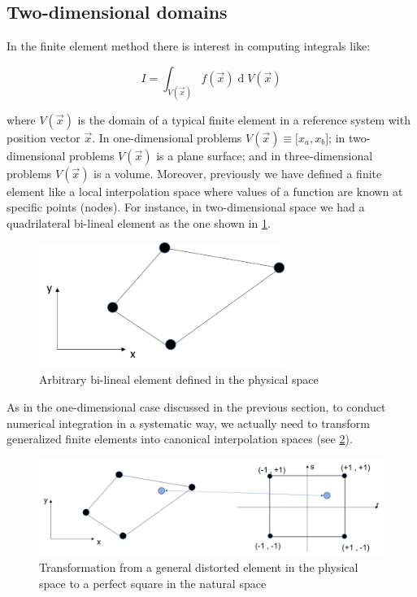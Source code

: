 \subsection{Two-dimensional domains}
In the finite element method there is interest in computing integrals like:

\begin{equation}
I=\int_{V(\overrightarrow x)} f(\overrightarrow x)\operatorname dV(\overrightarrow x)
\label{integral}
\end{equation}

where $V(\overrightarrow x)$ is the domain of a typical finite element in a reference system with position vector $\overrightarrow x$. In one-dimensional problems $V(\overrightarrow x)\equiv\lbrack x_a,x_b\rbrack$; in two-dimensional problems $V(\overrightarrow x)$ is a plane surface; and in three-dimensional problems $V(\overrightarrow x)$ is a volume. Moreover, previously we have defined a finite element like a local interpolation space where values of a function are known at specific points (nodes). For instance, in two-dimensional space we had a quadrilateral bi-lineal element as the one shown in \cref{fig:generalElement}.

%
\begin{figure}[H]
\centering
\includegraphics[width=8cm]{img/physical}
\caption{Arbitrary bi-lineal element defined in the physical space}
\label{fig:generalElement}
\end{figure}

As in the one-dimensional case discussed in the previous section, to conduct numerical integration in a systematic way, we actually need to transform generalized finite elements into canonical interpolation spaces (see \cref{fig:IsoTrans}).

\begin{figure}[H]
\centering
\includegraphics[width=12cm]{img/isopar}
\caption{Transformation from a general distorted element in the physical space to a perfect square in the natural space}
\label{fig:IsoTrans}
\end{figure}

